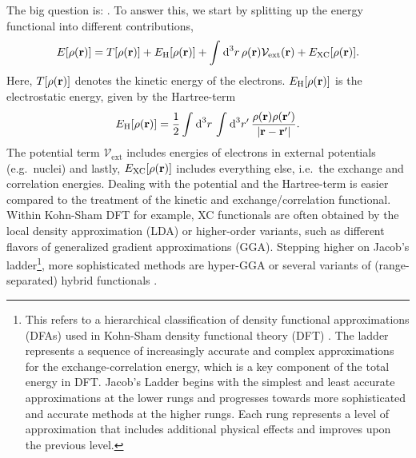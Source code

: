 \documentclass[../../main.tex]{subfiles}
\begin{document}
The big question is: . To answer this, we start by splitting up the energy functional into different contributions,
\begin{align}
	E[\rho(\textbf{r})]=T[\rho(\textbf{r})]+E_{\text{H}}[\rho(\textbf{r})]+\int_{}^{}\text{d}^3r\,\rho(\textbf{r})\mathcal{V}_{\mathrm{ext}}(\textbf{r})+E_{\text{XC}}[\rho(\textbf{r})].
\end{align}
Here, $T[\rho(\textbf{r})]$ denotes the kinetic energy of the electrons. $E_{\text{H}}[\rho(\textbf{r})]$ is the electrostatic energy, given by the Hartree-term
\begin{align}
	E_{\text{H}}[\rho(\textbf{r})]=\frac 12\int_{}^{}\text{d}^3r\,\int_{}^{}\text{d}^3r'\,\frac{\rho(\textbf{r})\rho(\textbf{r}')}{|\textbf{r}-\textbf{r}'|}.
\end{align}
The potential term $\mathcal{V}_{\mathrm{ext}}$ includes energies of electrons in external potentials (e.g.\ nuclei) and lastly, $E_{\text{XC}}[\rho(\textbf{r})]$ includes everything else, i.e.\ the exchange and correlation energies. Dealing with the potential and the Hartree-term is easier compared to the treatment of the kinetic and exchange/correlation functional. Within Kohn-Sham DFT for example, XC functionals are often obtained by the local density approximation (LDA) or higher-order variants, such as different flavors of generalized gradient approximations (GGA). Stepping higher on Jacob's ladder\footnote{This refers to a hierarchical classification of density functional approximations (DFAs) used in Kohn-Sham density functional theory (DFT) \cite{Perdew2001}. The ladder represents a sequence of increasingly accurate and complex approximations for the exchange-correlation energy, which is a key component of the total energy in DFT. Jacob's Ladder begins with the simplest and least accurate approximations at the lower rungs and progresses towards more sophisticated and accurate methods at the higher rungs. Each rung represents a level of approximation that includes additional physical effects and improves upon the previous level.}, more sophisticated methods are hyper-GGA or several variants of (range-separated) hybrid functionals \cite{Perdew2001}.
\end{document}
